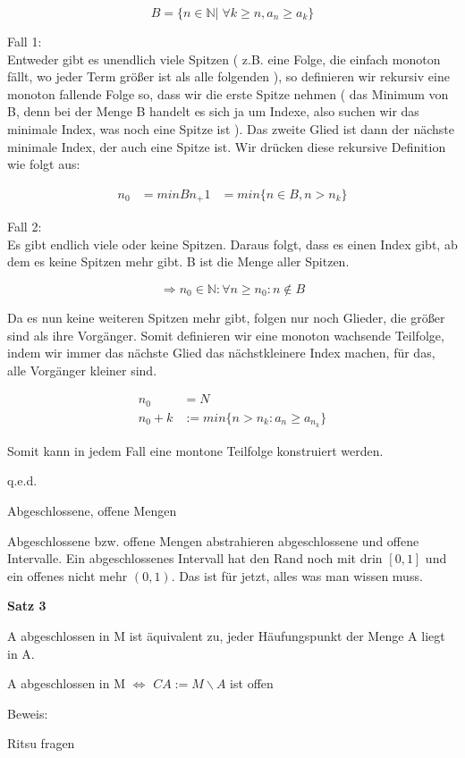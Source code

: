 \documentclass[headsepline,12pt,a4paper]{scrartcl}
\begin{document}
$$ B= \{n \in \mathbb{N} | \; \forall k \geq n, a_n \geq a_k \} $$

Fall 1:\\
Entweder gibt es unendlich viele Spitzen ( z.B. eine Folge, die einfach monoton fällt, wo jeder Term größer ist als alle folgenden ), so definieren wir rekursiv eine monoton fallende Folge so, dass wir die erste Spitze nehmen ( das Minimum von B, denn bei der Menge B handelt es sich ja um Indexe, also suchen wir das minimale Index, was noch eine Spitze ist ). Das zweite Glied ist dann der nächste minimale Index, der auch eine Spitze ist. Wir drücken diese rekursive Definition wie folgt aus:

\begin{equation} 
 \begin{aligned} 
  n_0&= min B
  n_+1&= min\{n \in B, n > n_k \}
 \end{aligned} 
\end{equation}

Fall 2: \\
Es gibt endlich viele oder keine Spitzen. Daraus folgt, dass es einen Index gibt, ab dem es keine Spitzen mehr gibt. B ist die Menge aller Spitzen. 

$$ \Rightarrow n_0 \in \mathbb{N} : \forall n \geq n_0 : n \not \in B $$

Da es nun keine weiteren Spitzen mehr gibt, folgen nur noch Glieder, die größer sind als ihre Vorgänger. Somit definieren wir eine monoton wachsende Teilfolge, indem wir immer das nächste Glied das nächstkleinere Index machen, für das, alle Vorgänger kleiner sind. 

\begin{equation} 
 \begin{aligned} 
  n_0 &= N \\
  n_0+k &:= min\{n>n_k : a_n \geq a_{n_k}\}  
 \end{aligned} 
\end{equation}
 
Somit kann in jedem Fall eine montone Teilfolge konstruiert werden. \begin{flushright}
q.e.d. 
\end{flushright}

\begin{center}
\item[Abgeschlossene, offene Mengen]
\end{center}
\item Abgeschlossene bzw. offene Mengen abstrahieren abgeschlossene und offene Intervalle. Ein abgeschlossenes Intervall hat den Rand noch mit drin $ [0,1] $ und ein offenes nicht mehr $(0,1)$. Das ist für jetzt, alles was man wissen muss.
\item \textbf{Satz 3}
\item A abgeschlossen in M ist äquivalent zu, jeder Häufungspunkt der Menge A liegt in A. 
\item A abgeschlossen in M $\Leftrightarrow$ $CA := M\backslash A$ ist offen 
\item Beweis:\\
\item Ritsu fragen
\end{document}
